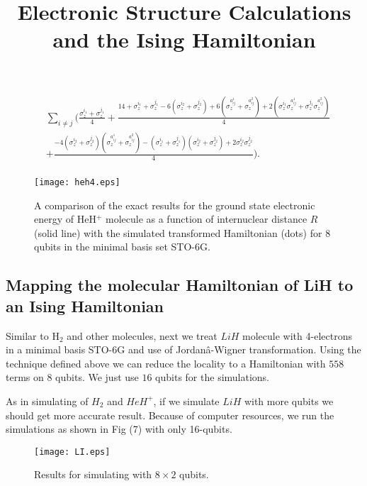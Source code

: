 \documentclass{article}
\newcommand\z[1]{\sigma_z^{#1}}\title{Electronic Structure Calculations and the Ising Hamiltonian}
\begin{document}
\begin{equation}
\begin{aligned}
&\sum_{i\neq j}(\frac{\z{i_1}+\z{j_1}}{4}+\frac{14+\z{i_1}+\z{j_1}-6(\z{i_2}+\z{j_2})+6(\z{a_{ij}^1}+\z{a_{ij}^2})+2(\z{i_1}\z{a_{ij}^1}+\z{j_1}\z{a_{ij}^2})}{4}\\
&+\frac{-4(\z{i_2}+\z{j_2})(\z{a_{ij}^1}+\z{a_{ij}^2})-(\z{i_1}+\z{j_1})(\z{i_2}+\z{j_2})+2\z{i_2}\z{j_2}}{4}) .\\
\end{aligned}
\end{equation}

\begin{figure}[H]
\begin{center}
\texttt{[image: heh4.eps]}
\caption{A comparison of the exact results for the ground state electronic energy of HeH$^+$ molecule as a function of internuclear distance $R$ (solid line) with the simulated transformed Hamiltonian (dots) for $8$ qubits in the minimal basis set STO-6G.}
\end{center}
\end{figure}


\subsection*{Mapping the molecular Hamiltonian of LiH to an Ising Hamiltonian}

Similar to H$_2$ and other molecules, next we treat $LiH$ molecule with 4-electrons in a minimal basis STO-6G and use of Jordanâ-Wigner transformation. Using the technique defined above \cite{bravyi2017tapering} we can reduce the locality to a Hamiltonian with $558$ terms on $8$ qubits. We just use $16$ qubits for the simulations. 

As in simulating of $H_2$ and $HeH^+$, if we simulate $LiH$ with more qubits we should get more accurate result. Because of computer resources, we run the simulations as shown in Fig (7) with only 16-qubits. 


\begin{figure}[H]
\begin{center}
\texttt{[image: LI.eps]}
\caption{Results for simulating with $8 \times 2$ qubits.}
\end{center}
\end{figure}
\end{document}

